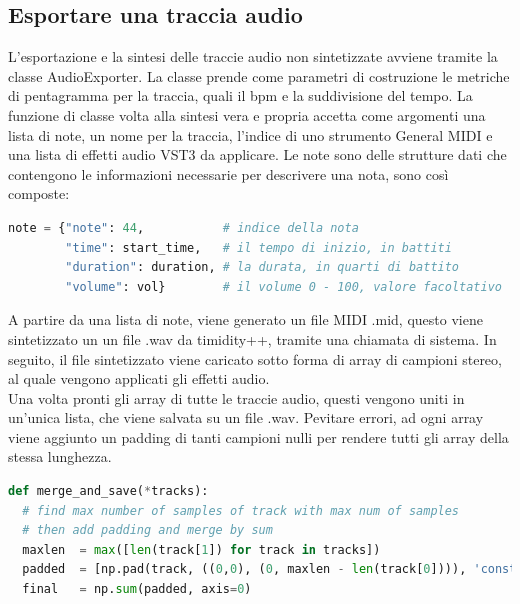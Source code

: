 \subsection{Esportare una traccia audio}
L'esportazione e la sintesi delle traccie audio non sintetizzate avviene tramite la classe AudioExporter.
La classe prende come parametri di costruzione le metriche di pentagramma per la traccia, quali il bpm e la suddivisione del tempo.
La funzione di classe volta alla sintesi vera e propria accetta come argomenti una lista di note, un nome per la traccia, l'indice di uno strumento General MIDI e una lista di effetti audio VST3 da applicare.
Le note sono delle strutture dati che contengono le informazioni necessarie per descrivere una nota, sono così composte:
\begin{lstlisting}[language=Python]
note = {"note": 44,           # indice della nota
        "time": start_time,   # il tempo di inizio, in battiti 
        "duration": duration, # la durata, in quarti di battito
        "volume": vol}        # il volume 0 - 100, valore facoltativo
\end{lstlisting}
A partire da una lista di note, viene generato un file MIDI .mid, questo viene sintetizzato un un file .wav da timidity++, tramite una chiamata di sistema.
In seguito, il file sintetizzato viene caricato sotto forma di array di campioni stereo, al quale vengono applicati gli effetti audio.
\\
Una volta pronti gli array di tutte le traccie audio, questi vengono uniti in un'unica lista, che viene salvata su un file .wav.
Pevitare errori, ad ogni array viene aggiunto un padding di tanti campioni nulli per rendere tutti gli array della stessa lunghezza.
\begin{lstlisting}[language=Python]
def merge_and_save(*tracks):
  # find max number of samples of track with max num of samples
  # then add padding and merge by sum
  maxlen  = max([len(track[1]) for track in tracks])
  padded  = [np.pad(track, ((0,0), (0, maxlen - len(track[0]))), 'constant', constant_values=0) for track in tracks]
  final   = np.sum(padded, axis=0)
\end{lstlisting}


